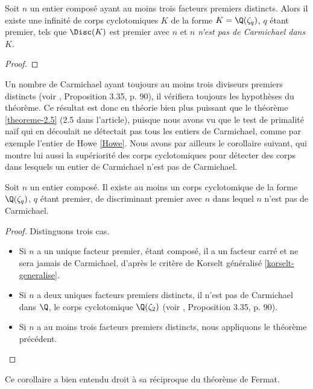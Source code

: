 \begin{theoreme}\label{theoreme-3.6}
	Soit $n$ un entier composé ayant au moins trois facteurs premiers distincts. Alors il existe une infinité de corps cyclotomiques $K$ de la forme $K = \Q(\zeta_q)$, $q$ étant premier, tels que $\Disc(K)$ est premier avec $n$ et $n$ \emph{n'est pas de Carmichael dans $K$}.
\end{theoreme}

\begin{proof}
\end{proof}

Un nombre de Carmichael ayant toujours au moins trois diviseurs premiers distincts (voir \cite{Demazure}, Proposition 3.35, p. 90), il vérifiera toujours les hypothèses du théorème. Ce résultat est donc en théorie bien plus puissant que le théorème \ref{theoreme-2.5} (2.5 dans l'article), puisque nous avons vu que le test de primalité naïf qui en découlait ne détectait pas tous les entiers de Carmichael, comme par exemple l'entier de Howe \ref{Howe}. Nous avons par ailleurs le corollaire suivant, qui montre lui aussi la supériorité des corps cyclotomiques pour détecter des corps dans lesquels un entier de Carmichael n'est pas de Carmichael.

\begin{corollaire}\label{corollaire-3.7}
	Soit $n$ un entier composé. Il existe au moins un corps cyclotomique de la forme $\Q(\zeta_q)$, $q$ étant premier, de discriminant premier avec $n$ dans lequel $n$ n'est pas de Carmichael.
\end{corollaire}

\begin{proof}
	Distinguons trois cas.
	\begin{itemize}
		\item Si $n$ a un unique facteur premier, étant composé, il a un facteur carré et ne sera jamais de Carmichael, d'après le critère de Korselt généralisé \ref{korselt-generalise}.
		\item Si $n$ a deux uniques facteurs premiers distincts, il n'est pas de Carmichael dans $\Q$, le corps cyclotomique $\Q(\zeta_2)$ (voir \cite{Demazure}, Proposition 3.35, p. 90).
		\item Si $n$ a au moins trois facteurs premiers distincts, nous appliquons le théorème précédent.
	\end{itemize}
\end{proof}

Ce corollaire a bien entendu droit à sa réciproque du théorème de Fermat.

